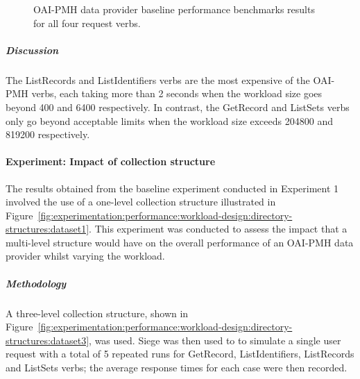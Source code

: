 % 
% 
\begin{comment}workloads.\index{Workload}
\tablespacing

\bodyspacing
\end{comment}

\begin{figure}
 \centering
 \framebox[\textwidth]{%

 }
 \caption[Baseline performance benchmarks for OAI-PMH data provider]{OAI-PMH data provider baseline performance benchmarks results for all four request verbs.}
 \label{fig:experimentation:performance:oaipmh:verbs-baseline}
\end{figure}


\subparagraph{Discussion}

The ListRecords and ListIdentifiers verbs are the most expensive of the OAI-PMH verbs, each taking more than \num{2} seconds when the workload size goes beyond \num{400} and \num{6400} respectively. In contrast, the GetRecord and ListSets verbs only go beyond acceptable limits when the workload size exceeds \num{204800} and \num{819200} respectively. 

\paragraph{Experiment: Impact of collection structure}
\label{sec:evaluation:performance:oaipmh-data-provider:experiment2}

The results obtained from the baseline experiment conducted in Experiment 1
involved the use of a one-level collection structure illustrated in Figure~\ref{fig:experimentation:performance:workload-design:directory-structures:dataset1}. This experiment was
conducted to assess the impact that a multi-level structure would have on the
overall performance of an OAI-PMH data provider whilst varying the workload.

\subparagraph{Methodology} %

A three-level collection structure, shown in Figure~\ref{fig:experimentation:performance:workload-design:directory-structures:dataset3}, was used. Siege was then used to to simulate a single user request with a total of 5 repeated runs for GetRecord, ListIdentifiers, ListRecords and ListSets verbs; the average response times for each case were then recorded.

